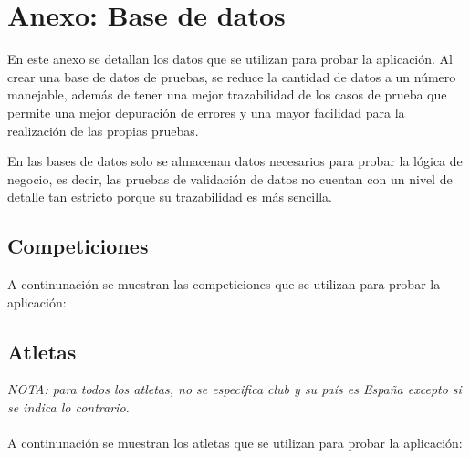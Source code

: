 \chapter{Anexo: Base de datos}\label{anexo:bbdd}
En este anexo se detallan los datos que se utilizan para probar la aplicación. Al crear una base de datos
de pruebas, se reduce la cantidad de datos a un número manejable, además de tener una mejor trazabilidad
de los casos de prueba que permite una mejor depuración de errores y una mayor facilidad para la realización
de las propias pruebas.

En las bases de datos solo se almacenan datos necesarios para probar la lógica de negocio, es decir, las pruebas
de validación de datos no cuentan con un nivel de detalle tan estricto porque su trazabilidad es más sencilla.

\section{Competiciones}
A continunación se muestran las competiciones que se utilizan para probar la aplicación:
\begin{table}[H]
	\centering
	\caption{Base de datos de prueba de competiciones}
\end{table}

\section{Atletas}
\textit{NOTA: para todos los atletas, no se especifica club y su país es España excepto si se indica lo contrario.} \\ \\
A continunación se muestran los atletas que se utilizan para probar la aplicación:

